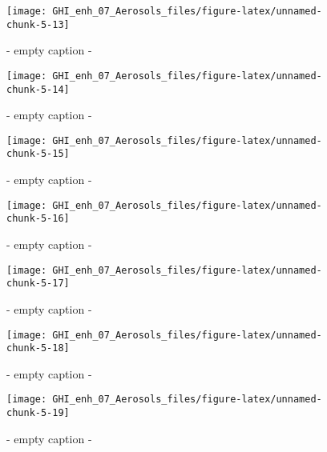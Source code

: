 \documentclass[
  10pt,
  a4paper,oneside]{article}
\begin{document}
\begin{figure}[H]

{\centering \texttt{[image: GHI\_enh\_07\_Aerosols\_files/figure-latex/unnamed-chunk-5-13]} 

}

\caption{ - empty caption - }\label{fig:unnamed-chunk-5-13}
\end{figure}
\begin{figure}[H]

{\centering \texttt{[image: GHI\_enh\_07\_Aerosols\_files/figure-latex/unnamed-chunk-5-14]} 

}

\caption{ - empty caption - }\label{fig:unnamed-chunk-5-14}
\end{figure}
\begin{figure}[H]

{\centering \texttt{[image: GHI\_enh\_07\_Aerosols\_files/figure-latex/unnamed-chunk-5-15]} 

}

\caption{ - empty caption - }\label{fig:unnamed-chunk-5-15}
\end{figure}
\begin{figure}[H]

{\centering \texttt{[image: GHI\_enh\_07\_Aerosols\_files/figure-latex/unnamed-chunk-5-16]} 

}

\caption{ - empty caption - }\label{fig:unnamed-chunk-5-16}
\end{figure}
\begin{figure}[H]

{\centering \texttt{[image: GHI\_enh\_07\_Aerosols\_files/figure-latex/unnamed-chunk-5-17]} 

}

\caption{ - empty caption - }\label{fig:unnamed-chunk-5-17}
\end{figure}
\begin{figure}[H]

{\centering \texttt{[image: GHI\_enh\_07\_Aerosols\_files/figure-latex/unnamed-chunk-5-18]} 

}

\caption{ - empty caption - }\label{fig:unnamed-chunk-5-18}
\end{figure}
\begin{figure}[H]

{\centering \texttt{[image: GHI\_enh\_07\_Aerosols\_files/figure-latex/unnamed-chunk-5-19]} 

}

\caption{ - empty caption - }\label{fig:unnamed-chunk-5-19}
\end{figure}
\end{document}

